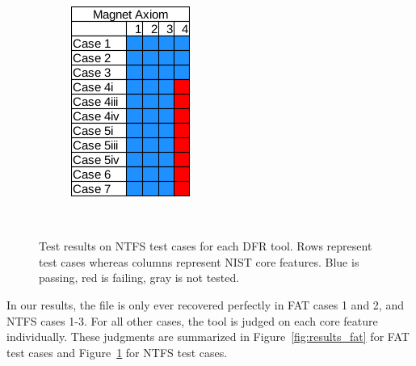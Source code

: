 \begin{figure}[h]
\begin{subfigure}{0.17\linewidth}
        \includegraphics[width=\linewidth]{fig/axiom_results_ntfs.png}
    \end{subfigure}~~
        
    \caption{Test results on NTFS test cases for each DFR tool. Rows represent test cases whereas columns represent NIST core features. Blue is passing, red is failing, gray is not tested.}
    \label{fig:results_ntfs}
\end{figure}

In our results, the file is only ever recovered perfectly in FAT cases 1 and 2, and NTFS cases 1-3. 
For all other cases, the tool is judged on each core feature individually. 
These judgments are summarized in Figure~\ref{fig:results_fat} for FAT test cases and Figure~\ref{fig:results_ntfs} for NTFS test cases.



